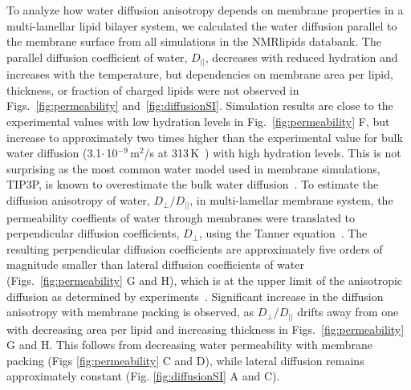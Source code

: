 \documentclass[fleqn,10pt]{wlscirep}
\begin{document}
To analyze how water diffusion anisotropy depends on membrane properties in a multi-lamellar lipid bilayer system, we calculated the water diffusion parallel to the membrane surface from all simulations in the NMRlipids databank. The parallel diffusion coefficient of water, $D_{||}$, decreases with reduced hydration and increases with the temperature, but dependencies on membrane area per lipid, thickness, or fraction of charged lipids were not observed in Figs.~\ref{fig:permeability} and~\ref{fig:diffusionSI}.
Simulation results are close to the experimental values with low hydration levels in Fig.~\ref{fig:permeability} F, but increase to approximately two times higher than the experimental value for bulk water diffusion (3.1$\cdot$\,10$^{-9}$\,m$^2$/s at 313\,K~\cite{khakimov08}) with high hydration levels. This is not surprising as the most common water model used in membrane simulations, TIP3P, is known to overestimate the bulk water diffusion~\cite{pathirannahalage21}. To estimate the diffusion anisotropy of water, $D_{\perp}/D_{||}$, in multi-lamellar membrane system, the permeability coeffients of water through membranes were translated to perpendicular diffusion coefficients, $D_{\perp}$, using the Tanner equation~\cite{tanner78,wasterby02}. The resulting perpendicular diffusion coefficients are approximately five orders of magnitude smaller than lateral diffusion coefficients of water (Figs.~\ref{fig:permeability} G and H), which is at the upper limit of the anisotropic diffusion as determined by experiments~\cite{nitsche19}. 
Significant increase in the diffusion anisotropy with membrane packing is observed, as $D_{\perp}/D_{||}$ drifts away from one with decreasing area per lipid and increasing thickness in Figs.~\ref{fig:permeability} G and H. This follows from decreasing water permeability with membrane packing (Figs \ref{fig:permeability} C and D), while lateral diffusion remains approximately constant (Fig. \ref{fig:diffusionSI} A and C). 
\end{document}
